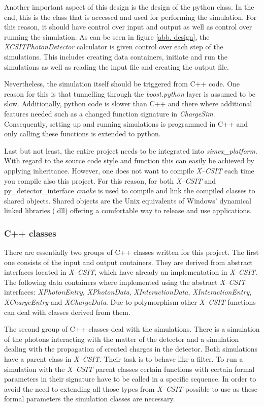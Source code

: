 Another important aspect of this design is the design of the python class. In
the end, this is the class that is accessed and used for performing the
simulation. For this reason, it should have control over input and output as
well as control over running the simulation. As can be seen in figure \ref{abb.
design}, the \textit{XCSITPhotonDetector} calculator is given control over each
step of the simulations. This includes creating data containers, initiate and
run the simulations as well as reading the input file and creating the output
file.

Nevertheless, the simulation itself should be triggered from C++ code. One
reason for this is that tunnelling through the \textit{boost.python} layer is
assumed to be slow. Additionally, python code is slower than C++ and there where
additional features needed such as a changed function signature in
\textit{ChargeSim}. Consequently, setting up and running simulations is
programmed in C++ and only calling these functions is extended to python.

Last but not least, the entire project needs to be integrated into
\textit{simex\_platform}. With regard to the source code style and function this can
easily be achieved by applying inheritance. However, one does not want to
compile \textit{X--CSIT} each time you compile also this project. For this
reason, for both \textit{X--CSIT} and py\_detector\_interface \textit{cmake} is
used to compile and link the compiled classes to shared objects. Shared objects
are the Unix equivalents of Windows' dynamical linked libraries (.dll) offering
a comfortable way to release and use applications.

\subsubsection{C++ classes}
There are essentially two groups of C++ classes written for this project. The
first one consists of the input and output containers. They are derived from
abstract interfaces located in \textit{X--CSIT}, which have already an
implementation in \textit{X--CSIT}. The following data containers where implemented
using the abstract \textit{X--CSIT} interfaces: \textit{XPhotonEntry},
\textit{XPhotonData}, \textit{XInteractionData}, \textit{XInteractionEntry},
\textit{XChargeEntry} and \textit{XChargeData}. Due to polymorphism other
\textit{X--CSIT} functions can deal with classes derived from them.

The second group of C++ classes deal with the simulations. There is a simulation
of the photons interacting with the  matter of the detector and a simulation
dealing with the propagation of created charges in the detector. Both
simulations have a parent class in \textit{X--CSIT}. Their task is to behave like
a filter. To run a simulation with the \textit{X--CSIT} parent classes certain
functions with certain formal parameters in their signature have to be called in
a specific sequence. In order to avoid the need to extending all those types
from \textit{X--CSIT} possible to use as these formal parameters the simulation
classes are necessary.

